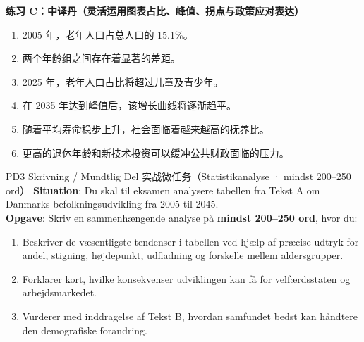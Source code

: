\textbf{练习 C：中译丹（灵活运用图表占比、峰值、拐点与政策应对表达）}
\begin{enumerate}
  \item 2005 年，老年人口占总人口的 15.1\%。
  \item 两个年龄组之间存在着显著的差距。
  \item 2025 年，老年人口占比将超过儿童及青少年。
  \item 在 2035 年达到峰值后，该增长曲线将逐渐趋平。
  \item 随着平均寿命稳步上升，社会面临着越来越高的抚养比。
  \item 更高的退休年龄和新技术投资可以缓冲公共财政面临的压力。
\end{enumerate}


\begin{emailbox}{PD3 Skrivning / Mundtlig Del 实战微任务（Statistikanalyse · mindst 200--250 ord）}
\textbf{Situation}: Du skal til eksamen analysere tabellen fra Tekst A om Danmarks befolkningsudvikling fra 2005 til 2045.\\
\textbf{Opgave}: Skriv en sammenhængende analyse på \textbf{mindst 200--250 ord}, hvor du:
\begin{enumerate}
  \item Beskriver de væsentligste tendenser i tabellen ved hjælp af præcise udtryk for andel, stigning, højdepunkt, udfladning og forskelle mellem aldersgrupper.
  \item Forklarer kort, hvilke konsekvenser udviklingen kan få for velfærdsstaten og arbejdsmarkedet.
  \item Vurderer med inddragelse af Tekst B, hvordan samfundet bedst kan håndtere den demografiske forandring.
\end{enumerate}
\end{emailbox}

